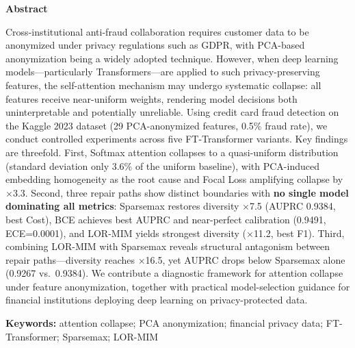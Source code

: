 \begin{abstract}
\noindent
在金融反欺诈的行业实践中，数据隐私法规（如《个人信息保护法》、GDPR）要求跨机构共享的客户数据必须经过匿名化处理，PCA匿名化正是最常见的脱敏手段之一。然而，当深度学习模型（以Transformer为代表）被应用于此类丧失了语义身份的特征数据时，其赖以工作的自注意力机制可能发生系统性塌缩——所有特征被等权对待，模型的决策过程丧失了可区分性和可解释性。本文以信用卡欺诈检测为具体场景，在Kaggle 2023数据集（29维PCA匿名化特征，0.5\%欺诈率）上通过五个FT-Transformer变体的受控实验，对这一问题进行了系统诊断。核心发现：（1）PCA匿名化特征空间中，Softmax自注意力塌缩为均匀分布（标准差仅为均匀基线的3.6\%），根因是特征嵌入的方向同构性，Focal Loss进一步将塌缩放大了$\times$3.3；（2）三种修复路径各有边界，且\textbf{没有任何模型在所有指标上全面占优}——归一化端Sparsemax恢复多样性$\times$7.5（AUPRC 0.9384，Cost最优）、损失端BCE AUPRC和校准均最优（0.9491, ECE=0.0001）、数据端LOR-MIM恢复多样性最显著（$\times$11.2, F1最优）；（3）LOR-MIM与Sparsemax联合使用揭示数据端与归一化端修复之间存在结构性拮抗——注意力多样性进一步提升（$\times$16.5），但AUPRC反而下降（0.9267）。本文的实践意义在于：为金融机构在匿名化数据上应用深度学习时面临的"模型是否可信"问题，提供了一套可操作的诊断流程和基于特征匿名化程度的模型选型参考。

\vspace{1em}
\noindent\textbf{关键词：}自注意力塌缩；PCA匿名化；金融隐私数据；FT-Transformer；Sparsemax；LOR-MIM
\end{abstract}

\begin{center}
{\Large\textbf{Abstract}}
\end{center}
\noindent
Cross-institutional anti-fraud collaboration requires customer data to be anonymized under privacy regulations such as GDPR, with PCA-based anonymization being a widely adopted technique. However, when deep learning models---particularly Transformers---are applied to such privacy-preserving features, the self-attention mechanism may undergo systematic collapse: all features receive near-uniform weights, rendering model decisions both uninterpretable and potentially unreliable. Using credit card fraud detection on the Kaggle 2023 dataset (29 PCA-anonymized features, 0.5\% fraud rate), we conduct controlled experiments across five FT-Transformer variants. Key findings are threefold. First, Softmax attention collapses to a quasi-uniform distribution (standard deviation only 3.6\% of the uniform baseline), with PCA-induced embedding homogeneity as the root cause and Focal Loss amplifying collapse by $\times$3.3. Second, three repair paths show distinct boundaries with \textbf{no single model dominating all metrics}: Sparsemax restores diversity $\times$7.5 (AUPRC 0.9384, best Cost), BCE achieves best AUPRC and near-perfect calibration (0.9491, ECE=0.0001), and LOR-MIM yields strongest diversity ($\times$11.2, best F1). Third, combining LOR-MIM with Sparsemax reveals structural antagonism between repair paths---diversity reaches $\times$16.5, yet AUPRC drops below Sparsemax alone (0.9267 vs.\ 0.9384). We contribute a diagnostic framework for attention collapse under feature anonymization, together with practical model-selection guidance for financial institutions deploying deep learning on privacy-protected data.

\vspace{1em}
\noindent\textbf{Keywords:} attention collapse; PCA anonymization; financial privacy data; FT-Transformer; Sparsemax; LOR-MIM

